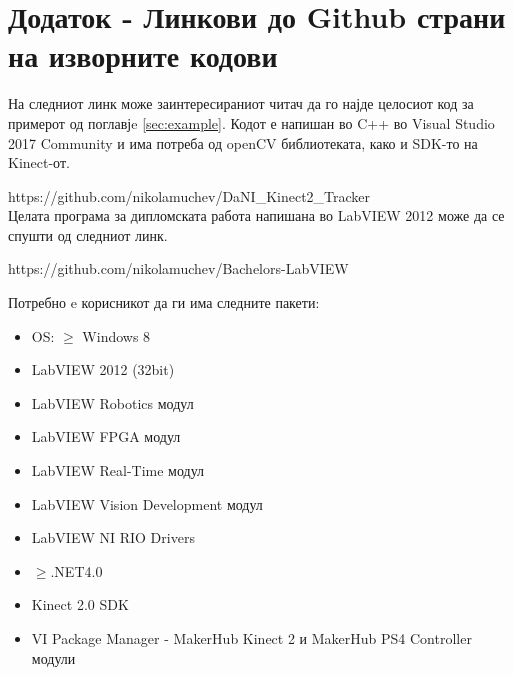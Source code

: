 \documentclass[11pt]{article}
\begin{document}

\newpage

\section*{Додаток - Линкови до Github страни на изворните кодови}
    На следниот линк може заинтересираниот читач да го најде целосиот код за примерот од поглавјe \ref{sec:example}. Кодот е напишан во C++ во Visual Studio 2017 Community и има потреба од openCV библиотеката, како и SDK-то на Kinect-от.

    https://github.com/nikolamuchev/DaNI\_Kinect2\_Tracker
    \\
    Целата програма за дипломската работа напишана во LabVIEW 2012 може да се спушти од следниот линк.

    https://github.com/nikolamuchev/Bachelors-LabVIEW

    Потребно e корисникот да ги има следните пакети:
    \begin{itemize}
      \item OS: $\geq$ Windows 8
      \item LabVIEW 2012 (32bit)
      \item LabVIEW Robotics модул
      \item LabVIEW FPGA модул
      \item LabVIEW Real-Time модул
      \item LabVIEW Vision Development модул
      \item LabVIEW NI RIO Drivers
      \item $\geq$.NET4.0
      \item Kinect 2.0 SDK
      \item VI Package Manager - MakerHub Kinect 2 и MakerHub PS4 Controller модули
      \end{itemize}

\medskip
\nocite{*}

\newpage

\printbibliography[heading=bibintoc,title={Библиографија}]
\end{document}
